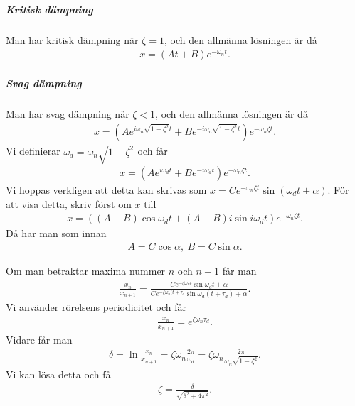 \subparagraph{Kritisk dämpning}
Man har kritisk dämpning när $\zeta = 1$, och den allmänna lösningen är då
\begin{align*}
	x = (At + B)e^{-\omega_nt}.
\end{align*}

\subparagraph{Svag dämpning}
Man har svag dämpning när $\zeta < 1$, och den allmänna lösningen är då
\begin{align*}
	x = \left(Ae^{i\omega_n\sqrt{1 - \zeta^2}t} + Be^{-i\omega_n\sqrt{1 - \zeta^2}t}\right)e^{-\omega_n\zeta t}.
\end{align*}
Vi definierar $\omega_d = \omega_n\sqrt{1 - \zeta^2}$ och får
\begin{align*}
	x = \left(Ae^{i\omega_dt} + Be^{-i\omega_dt}\right)e^{-\omega_n\zeta t}.
\end{align*}
Vi hoppas verkligen att detta kan skrivas som $x = Ce^{-\omega_n\zeta t}\sin{\left(\omega_dt + \alpha\right)}$. För att visa detta, skriv först om $x$ till
\begin{align*}
	x = \left((A + B)\cos{\omega_dt} + (A - B)i\sin{i\omega_dt}\right)e^{-\omega_n\zeta t}.
\end{align*}
Då har man som innan
\begin{align*}
	A = C\cos{\alpha},\ B = C\sin{\alpha}.
\end{align*}

Om man betraktar maxima nummer $n$ och $n - 1$ får man
\begin{align*}
	\frac{x_{n}}{x_{n + 1}} = \frac{Ce^{-\zeta\omega_nt}\sin{\omega_dt + \alpha}}{Ce^{-\zeta\omega_n(t + \tau_d}\sin{\omega_d(t + \tau_d) + \alpha}}.
\end{align*}
Vi använder rörelsens periodicitet och får
\begin{align*}
	\frac{x_{n}}{x_{n + 1}} = e^{\zeta\omega_n\tau_{d}}.
\end{align*}
Vidare får man
\begin{align*}
	\delta = \ln{\frac{x_n}{x_{n + 1}}} = \zeta\omega_n\frac{2\pi}{\omega_d} = \zeta\omega_n\frac{2\pi}{\omega_n\sqrt{1 - \zeta^2}}.
\end{align*}
Vi kan lösa detta och få
\begin{align*}
	\zeta = \frac{\delta}{\sqrt{\delta^2 + 4\pi^2}}.
\end{align*}

